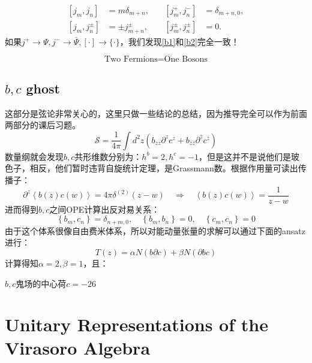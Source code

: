 \begin{equation}\label{b2}
	\boxed{
		\begin{aligned}\left[j_m,j_n\right]&=m\delta_{m+n},\quad&\left[j_m^+,j_n^-\right]&=\delta_{m+n,0},\\\left[j_m,j_n^\pm\right]&=\pm j_{m+n}^\pm,\quad&\left[j_m^\pm,j_n^\pm\right]&=0.\end{aligned}
	}
\end{equation}
如果$j^+\to\Psi,j^-\to \bar \Psi,[\cdot]\to\{\cdot\}$，我们发现\ref{b1}和\ref{b2}完全一致！
\begin{theorem}[Bosonization]
	\begin{equation*}
		\text{Two Fermions} = \text{One Bosons}
	\end{equation*}
\end{theorem}
\subsection{$b,c$ ghost}
这部分是弦论非常关心的，这里只做一些结论的总结，因为推导完全可以作为前面两部分的课后习题。
\begin{equation}
	\mathcal{S}=\frac1{4\pi}\int d^2z\left(b_{zz}\partial^zc^z+b_{\bar z\bar 
		z}\partial^{\overline{z}}c^{\overline{z}}\right)
\end{equation}
数量纲就会发现$b,c$共形维数分别为：$h^b=2,h^c=-1$，但是这并不是说他们是玻色子，相反，他们暂时违背自旋统计定理，是Grassmann数。根据作用量可读出传播子：
\begin{equation}
	\partial^z\left\langle b(z)c(w)\right\rangle=4\pi\left.\delta^{(2)}(z-w)\quad\Rightarrow\quad\left\langle b(z)c(w)\right\rangle=\frac1{z-w}\right. 
\end{equation}
进而得到$b,c$之间OPE计算出反对易关系：
\begin{equation}
	\left\{b_m,c_n\right\}=\delta_{n+m,0},\quad\left\{b_m,b_n\right\}=0,\quad\left\{c_m,c_n\right\}=0
\end{equation}
由于这个体系很像自由费米体系，所以对能动量张量的求解可以通过下面的ansatz进行：
\begin{equation}
	T(z)=\alpha N\left(b\partial c\right)+\beta N\left(\partial bc\right)
\end{equation}
计算得知$\alpha=2,\beta=1$，且：
\begin{theorem}
	$b,c$鬼场的中心荷$\boxed{c=-26}$
\end{theorem}
\section{Unitary Representations of the Virasoro Algebra}
